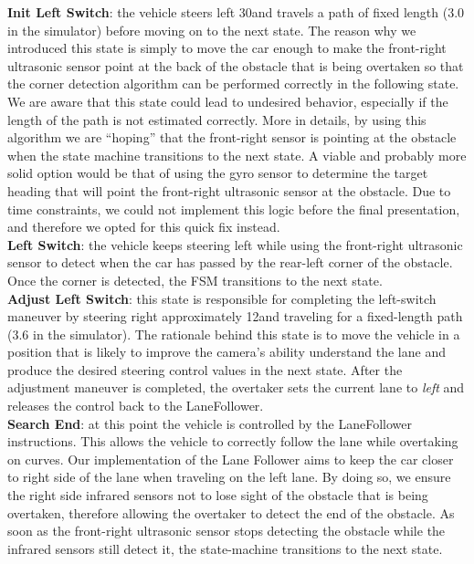\noindent
\textbf{Init Left Switch}: the vehicle steers left 30\degree and travels a path
of fixed length (3.0 in the simulator) before moving on to the next state. The
reason why we introduced this state is simply to move the car enough to make the
front-right ultrasonic sensor point at the back of the obstacle that is being
overtaken so that the corner detection algorithm can be performed correctly in
the following state. We are aware that this state could lead to undesired
behavior, especially if the length of the path is not estimated correctly. More
in details, by using this algorithm we are ``hoping'' that the front-right
sensor is pointing at the obstacle when the state machine transitions to the
next state. A viable and probably more solid option would be that of using the
gyro sensor to determine the target heading that will point the front-right
ultrasonic sensor at the obstacle. Due to time constraints, we could not
implement this logic before the final presentation, and therefore we opted for
this quick fix instead.\\

\noindent
\textbf{Left Switch}: the vehicle keeps steering left while using the
front-right ultrasonic sensor to detect when the car has passed by the rear-left
corner of the obstacle. Once the corner is detected, the FSM transitions to the
next state.\\

\noindent
\textbf{Adjust Left Switch}: this state is responsible for completing the
left-switch maneuver by steering right approximately 12\degree and traveling for
a fixed-length path (3.6 in the simulator). The rationale behind this state is
to move the vehicle in a position that is likely to improve the camera's ability
understand the lane and produce the desired steering control values in the next
state. After the adjustment maneuver is completed, the overtaker sets the
current lane to \textit{left} and releases the control back to the LaneFollower.
\\

\noindent
\textbf{Search End}: at this point the vehicle is controlled by the LaneFollower
instructions. This allows the vehicle to correctly follow the lane while
overtaking on curves. Our implementation of the Lane Follower  aims to keep the
car closer to right side of the lane when traveling on the left lane. By doing
so, we ensure the right side infrared sensors not to lose sight of the obstacle
that is being overtaken, therefore allowing the overtaker to detect the end of
the obstacle. As soon as the front-right ultrasonic sensor stops detecting the
obstacle while the infrared sensors still detect it, the state-machine
transitions to the next state.\\

